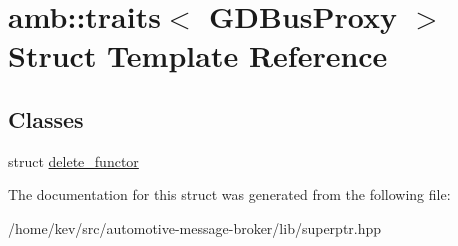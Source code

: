 \hypertarget{structamb_1_1traits_3_01GDBusProxy_01_4}{\section{amb\+:\+:traits$<$ G\+D\+Bus\+Proxy $>$ Struct Template Reference}
\label{structamb_1_1traits_3_01GDBusProxy_01_4}
}
\subsection*{Classes}
\begin{DoxyCompactItemize}
\item 
struct \hyperlink{structamb_1_1traits_3_01GDBusProxy_01_4_1_1delete__functor}{delete\+\_\+functor}
\end{DoxyCompactItemize}


The documentation for this struct was generated from the following file\+:\begin{DoxyCompactItemize}
\item 
/home/kev/src/automotive-\/message-\/broker/lib/superptr.\+hpp\end{DoxyCompactItemize}
